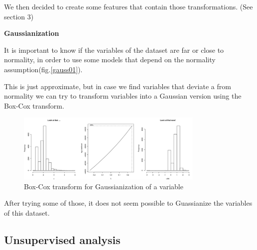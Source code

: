 We then decided to create some features that contain those transformations. (See section 3)

\textbf{Gaussianization}

It is important to know if the variables of the dataset are far or close to normality, in order to use some models that depend on the normality assumption(fig.\ref{gauss01}).

This is just approximate, but in case we find variables that deviate a from normality we can try to transform variables into a Gaussian version using the Box-Cox transform.

\begin{figure}[H]
    \centering
        \includegraphics[width=0.8\textwidth]{img/Gauss03.png}
    \caption{Box-Cox transform for Gaussianization of a variable }\label{fig:rf_sfs}
\end{figure}

After trying some of those, it does not seem possible to Guassianize the variables of this dataset.


\subsection{Unsupervised analysis}


